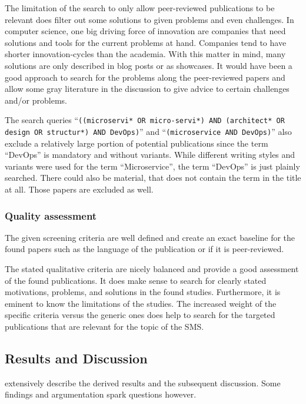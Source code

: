 The limitation of the search to only allow peer-reviewed publications
to be relevant does filter out some solutions to given problems and
even challenges. In computer science, one big driving force
of innovation are companies that need solutions and tools for the
current problems at hand. Companies tend to have shorter innovation-cycles
than the academia. With this matter in mind, many solutions are only described
in blog posts or as showcases. It would have been a good approach to search for the problems along
the peer-reviewed papers and allow some gray literature in the
discussion to give advice to certain challenges and/or problems.

The search queries
``\texttt{((microservi* OR micro-servi*) AND (architect* OR design OR structur*) AND DevOps)}''
and ``\texttt{(microservice AND DevOps)}'' \wsls
also exclude a relatively large portion of potential publications since 
the term ``DevOps'' is mandatory and without variants. While different
writing styles and variants were used for the term ``Microservice'', the term ``DevOps''
is just plainly searched. There could also be material, that does not
contain the term in the title at all. Those papers are excluded as well.

\subsubsection{Quality assessment}

The given screening criteria are well defined and create
an exact baseline for the found papers such as the
language of the publication or if it is peer-reviewed.

The stated qualitative criteria are nicely balanced
and provide a good assessment of the found publications.
It does make sense to search for clearly stated motivations,
problems, and solutions in the found studies. Furthermore, it is
eminent to know the limitations of the studies. The increased
weight of the specific criteria versus the generic ones does
help to search for the targeted publications that are relevant
for the topic of the SMS.

\subsection{Results and Discussion}

\smsAuthors extensively describe the derived results and
the subsequent discussion. Some findings and argumentation
spark questions however.

